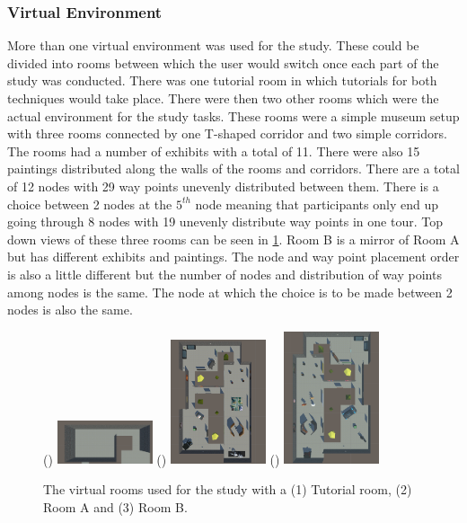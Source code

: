\subsubsection{Virtual Environment}
\label{subsubsection DPUS SP SS: Virtual Environment} 
More than one virtual environment was used for the study. These could be divided into rooms between which the user would switch once each part of the study was conducted. There was one tutorial room in which tutorials for both techniques would take place. There were then two other rooms which were the actual environment for the study tasks. These rooms were a simple museum setup with three rooms connected by one T-shaped corridor and two simple corridors. The rooms had a number of exhibits with a total of 11. There were also 15 paintings distributed along the walls of the rooms and corridors. There are a total of 12 nodes with 29 way points unevenly distributed between them. There is a choice between 2 nodes at the $5^{th}$ node meaning that participants only end up going through 8 nodes with 19 unevenly distribute way points in one tour. Top down views of these three rooms can be seen in \cref{fig:study-environment}. Room B is a mirror of Room A but has different exhibits and paintings. The node and way point placement order is also a little different but the number of nodes and distribution of way points among nodes is the same. The node at which the choice is to be made between 2 nodes is also the same. 

\begin{figure}[]
	()
	\includegraphics[width=0.25\textwidth]{images/tutorial-room.pdf}
	()
	\includegraphics[width=0.25\textwidth]{images/museum-1-objects.pdf}
	()
	\includegraphics[width=0.25\textwidth]{images/museum-2-objects.pdf}
	\caption{The virtual rooms used for the study with a (1) Tutorial room, (2) Room A and (3) Room B.}
	\label{fig:study-environment}
\end{figure}

